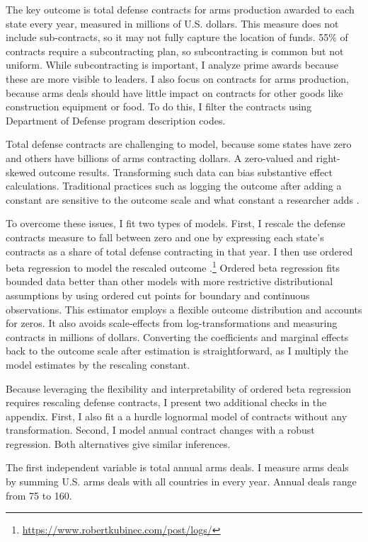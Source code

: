 \documentclass[12pt]{article}
\begin{document}
The key outcome is total defense contracts for arms production awarded to each state every year, measured in millions of U.S. dollars.
This measure does not include sub-contracts, so it may not fully capture the location of funds. 
55\% of contracts require a subcontracting plan, so subcontracting is common but not uniform.  
While subcontracting is important, I analyze prime awards because these are more visible to leaders. 
I also focus on contracts for arms production, because arms deals should have little impact on contracts for other goods like construction equipment or food.
To do this, I filter the contracts using Department of Defense program description codes. 


Total defense contracts are challenging to model, because some states have zero and others have billions of arms contracting dollars. 
A zero-valued and right-skewed outcome results. 
Transforming such data can bias substantive effect calculations.
Traditional practices such as logging the outcome after adding a constant are sensitive to the outcome scale and what constant a researcher adds \citep{ChenRoth2022, MullahyNorton2022}. 


To overcome these issues, I fit two types of models.
First, I rescale the defense contracts measure to fall between zero and one by expressing each state's contracts as a share of total defense contracting in that year.
I then use ordered beta regression to model the rescaled outcome \citep{Kubinec2023}.\footnote{\url{https://www.robertkubinec.com/post/logs/}} 
Ordered beta regression fits bounded data better than other models with more restrictive distributional assumptions by using ordered cut points for boundary and continuous observations. 
This estimator employs a flexible outcome distribution and accounts for zeros.
It also avoids scale-effects from log-transformations and measuring contracts in millions of dollars. 
Converting the coefficients and marginal effects back to the outcome scale after estimation is straightforward, as I multiply the model estimates by the rescaling constant.


Because leveraging the flexibility and interpretability of ordered beta regression requires rescaling defense contracts, I present two additional checks in the appendix. 
First, I also fit a a hurdle lognormal model of contracts without any transformation.
Second, I model annual contract changes with a robust regression. 
Both alternatives give similar inferences.


The first independent variable is total annual arms deals.  
I measure arms deals by summing U.S. arms deals with all countries in every year. 
Annual deals range from 75 to 160. 
\end{document}
